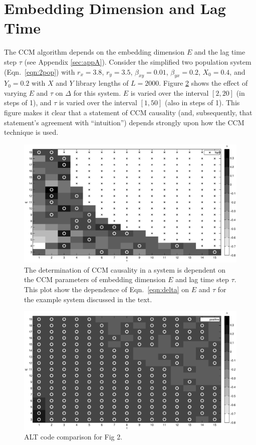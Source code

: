\documentclass[a4paper,11pt]{article}
\begin{document}
\section{Embedding Dimension and Lag Time}
The CCM algorithm depends on the embedding dimension $E$ and the lag time step $\tau$ (see Appendix \ref{sec:appA}).  Consider the simplified two population system (Eqn.\ \ref{eqn:2pop}) with $r_x=3.8$, $r_y=3.5$, $\beta_{xy}=0.01$, $\beta_{yx}=0.2$, $X_0=0.4$, and $Y_0=0.2$ with $X$ and $Y$ library lengths of $L=2000$.  Figure \ref{fig:} shows the effect of varying $E$ and $\tau$ on $\Delta$ for this system.  $E$ is varied over the interval $[2,20]$ (in steps of 1), and $\tau$ is varied over the interval $[1,50]$ (also in steps of 1).  This figure makes it clear that a statement of CCM causality (and, subsequently, that statement's agreement with ``intuition'') depends strongly upon how the CCM technique is used.
\newpage
\begin{figure}[ht]
\label{fig:}
\includegraphics[scale=0.4]{Figure2.eps}
\caption{The determination of CCM causality in a system is dependent on the CCM parameters of embedding dimension $E$ and lag time step $\tau$.  This plot show the dependence of Eqn.\ \ref{eqn:delta} on $E$ and $\tau$ for the example system discussed in the text.}
\end{figure}
\begin{figure}[ht]
\label{fig:}
\includegraphics[scale=0.4]{Figure2_alt.eps}
\caption{ALT code comparison for Fig 2.}
\end{figure}
\end{document}
